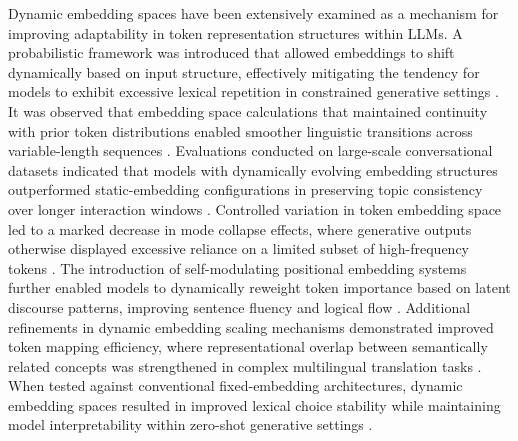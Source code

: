 Dynamic embedding spaces have been extensively examined as a mechanism for improving adaptability in token representation structures within LLMs. A probabilistic framework was introduced that allowed embeddings to shift dynamically based on input structure, effectively mitigating the tendency for models to exhibit excessive lexical repetition in constrained generative settings \cite{baronova2024dynamic}. It was observed that embedding space calculations that maintained continuity with prior token distributions enabled smoother linguistic transitions across variable-length sequences \cite{sawhai2024token}. Evaluations conducted on large-scale conversational datasets indicated that models with dynamically evolving embedding structures outperformed static-embedding configurations in preserving topic consistency over longer interaction windows \cite{ tokar2024contextual}. Controlled variation in token embedding space led to a marked decrease in mode collapse effects, where generative outputs otherwise displayed excessive reliance on a limited subset of high-frequency tokens \cite{chen2024dynamic}. The introduction of self-modulating positional embedding systems further enabled models to dynamically reweight token importance based on latent discourse patterns, improving sentence fluency and logical flow \cite{sasaki2024enhancing}. Additional refinements in dynamic embedding scaling mechanisms demonstrated improved token mapping efficiency, where representational overlap between semantically related concepts was strengthened in complex multilingual translation tasks \cite{tu2024reinforcement}. When tested against conventional fixed-embedding architectures, dynamic embedding spaces resulted in improved lexical choice stability while maintaining model interpretability within zero-shot generative settings \cite{wong2024efficiency}.